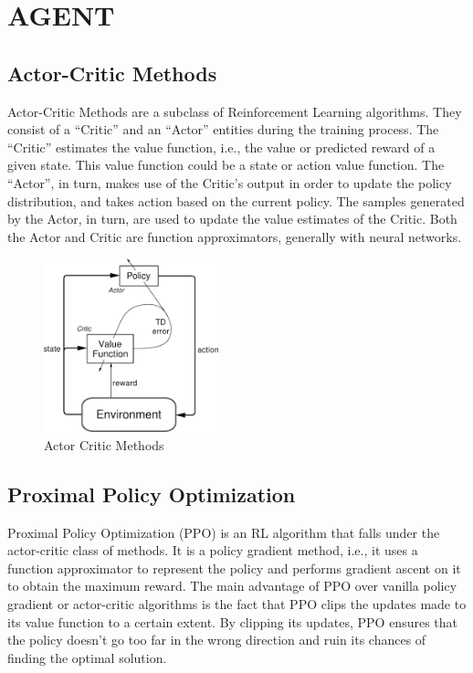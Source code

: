 \section{AGENT} \label{ch4Agent}

\subsection{Actor-Critic Methods}

Actor-Critic Methods are a subclass of Reinforcement Learning
algorithms. They consist of a ``Critic'' and an ``Actor'' entities
during the training process. The ``Critic'' estimates the value
function, i.e., the value or predicted reward of a given state. This
value function could be a state or action value function. The
``Actor'', in turn, makes use of the Critic's output in order to
update the policy distribution, and takes action based on the current
policy. The samples generated by the Actor, in turn, are used to
update the value estimates of the Critic. Both the Actor and Critic
are function approximators, generally with neural networks.

\begin{figure}[H]
    \centering
    \includegraphics[width=0.45\textwidth]{images/ActorCriticMethod.png}
    \caption{Actor Critic Methods}
    \label{fig:rl}
\end{figure}

\subsection{Proximal Policy Optimization}

Proximal Policy Optimization (PPO) is an RL algorithm that falls under
the actor-critic class of methods. It is a policy gradient method,
i.e., it uses a function approximator to represent the policy and
performs gradient ascent on it to obtain the maximum reward. The main
advantage of PPO over vanilla policy gradient or actor-critic
algorithms is the fact that PPO clips the updates made to its value
function to a certain extent. By clipping its updates, PPO ensures
that the policy doesn't go too far in the wrong direction and ruin its
chances of finding the optimal solution.

